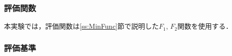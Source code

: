 \documentclass[a4j,11pt]{jarticle}
\begin{document}
\subsubsection{評価関数}
\label{sss:DNRBA-func}
本実験では，評価関数は\ref{ss:MinFunc}節で説明した$F_1$, $F_2$関数を使用する．









\subsubsection{評価基準}
\label{sss:DNRBA-eval}
\end{document}
